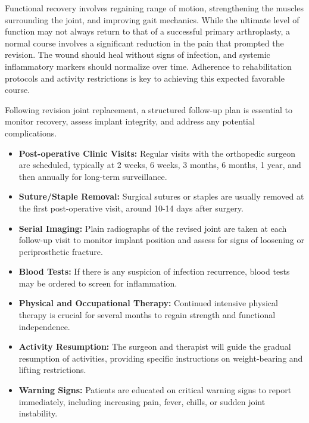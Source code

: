Functional recovery involves regaining range of motion, strengthening the muscles surrounding the joint, and improving gait mechanics. While the ultimate level of function may not always return to that of a successful primary arthroplasty, a normal course involves a significant reduction in the pain that prompted the revision. The wound should heal without signs of infection, and systemic inflammatory markers should normalize over time. Adherence to rehabilitation protocols and activity restrictions is key to achieving this expected favorable course.

Following revision joint replacement, a structured follow-up plan is essential to monitor recovery, assess implant integrity, and address any potential complications.

\begin{itemize}
  \item \textbf{Post-operative Clinic Visits:} Regular visits with the orthopedic surgeon are scheduled, typically at 2 weeks, 6 weeks, 3 months, 6 months, 1 year, and then annually for long-term surveillance.
  
  \item \textbf{Suture/Staple Removal:} Surgical sutures or staples are usually removed at the first post-operative visit, around 10-14 days after surgery.
  
  \item \textbf{Serial Imaging:} Plain radiographs of the revised joint are taken at each follow-up visit to monitor implant position and assess for signs of loosening or periprosthetic fracture.
  
  \item \textbf{Blood Tests:} If there is any suspicion of infection recurrence, blood tests may be ordered to screen for inflammation.
  
  \item \textbf{Physical and Occupational Therapy:} Continued intensive physical therapy is crucial for several months to regain strength and functional independence.
  
  \item \textbf{Activity Resumption:} The surgeon and therapist will guide the gradual resumption of activities, providing specific instructions on weight-bearing and lifting restrictions.
  
  \item \textbf{Warning Signs:} Patients are educated on critical warning signs to report immediately, including increasing pain, fever, chills, or sudden joint instability.
\end{itemize}

